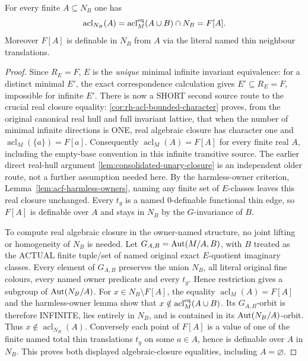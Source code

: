 \begin{theorem}
\label{thm:relative-real-closure}
For every finite $A\subseteq N_B$ one has
\begin{equation}\label{eq:full-owner-acl}
 \operatorname{acl}_{N_B}(A)=
 \operatorname{acl}^{\rm eq}_{M}(A\cup B)\cap N_B=F[A].
\end{equation}
Moreover $F[A]$ is definable in $N_B$ from $A$ via the
literal named thin neighbour translations.
\end{theorem}
\begin{proof}
Since $R_E=F$, $E$ is the \emph{unique} minimal
infinite invariant equivalence: for a distinct minimal
$E'$, the exact correspondence calculation gives
$E'\subseteq R_E=F$, impossible for infinite $E'$.
There is now a SHORT second source route
to the crucial real closure equality:
\cref{cor:rh-acl-bounded-character}
proves, from the original canonical real
hull and full invariant lattice, that
when the number of minimal infinite
directions is ONE, real algebraic
closure has character one and
$\operatorname{acl}_M(\{a\})=F[a]$.
Consequently
$\operatorname{acl}_M(A)=F[A]$
for every finite real $A$, including
the empty-base convention in this
infinite transitive source.
The earlier direct real-hull argument
\cref{lem:consolidated-unary-closure}
is an independent older route, not a
further assumption needed here.  By the harmless-owner
criterion, Lemma~\ref{lem:acf-harmless-owners}, naming
any finite set of $E$-classes leaves this real closure
unchanged.  Every $t_g$ is a named 0-definable functional
thin edge, so $F[A]$ is definable over $A$ and stays in
$N_B$ by the $G$-invariance of $B$.

To compute real algebraic closure in the owner-named
structure, no joint lifting or homogeneity of $N_B$
is needed. Let
$G_{A,B}=\operatorname{Aut}(M/A,B)$, with $B$ treated as the
ACTUAL finite tuple/set of named original exact
$E$-quotient imaginary classes. Every element
of $G_{A,B}$ preserves the union $N_B$, all
literal original fine colours, every named
owner predicate and every $t_g$. Hence restriction
gives a subgroup of $\operatorname{Aut}(N_B/A)$.
For $x\in N_B\setminus F[A]$,
the equality $\operatorname{acl}_M(A)=F[A]$
and the harmless-owner lemma show that
$x\notin\operatorname{acl}^{\rm eq}_M(A\cup B)$.
Its $G_{A,B}$-orbit is therefore INFINITE,
lies entirely in $N_B$, and is contained
in its $\operatorname{Aut}(N_B/A)$-orbit. Thus
$x\notin\operatorname{acl}_{N_B}(A)$.
Conversely each point of $F[A]$ is a value
of one of the finite named total thin
translations $t_g$ on some $a\in A$,
hence is definable over $A$ in $N_B$.
This proves both displayed algebraic-closure
equalities, including $A=\varnothing$.


\end{proof}
